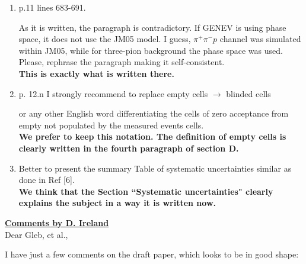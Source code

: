 \documentclass[,superscriptaddress,showpacs,amssymb,amsmath,amsfonts,linenumbers,article]{revtex4-1}
\begin{document}
\begin{enumerate}
\item  p.11 lines 683-691.

As it is written, the paragraph is contradictory. If GENEV is using phase space, it does not use the JM05 model. I guess, $\pi^+\pi^-p$ channel was simulated within JM05, while for three-pion background the phase space was used. Please, rephrase the paragraph making it self-consistent.\\[0.5cm]
{\bf  This is exactly what is written there.  }


\item  p. 12.n I strongly recommend to replace empty cells $\rightarrow$ blinded cells

or any other English word differentiating the cells of zero acceptance from empty not populated by the measured events cells.\\
{\bf We prefer to keep this notation. The definition of empty cells is clearly written in the fourth paragraph of section D.}


\item Better to present the summary Table of systematic uncertainties similar as done in Ref [6].\\
{\bf We think that the Section ``Systematic uncertainties" clearly explains the subject in a way it is written now.}\\[1cm]

\end{enumerate}



{\bf \Large \underline{Comments by D. Ireland}}\\[0.5cm]

Dear Gleb, et al.,

I have just a few comments on the draft paper, which looks to be in good shape:
\end{document}
